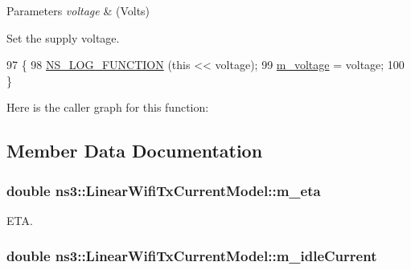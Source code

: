 \begin{DoxyParams}{Parameters}
{\em voltage} & (Volts)\\
\hline
\end{DoxyParams}
Set the supply voltage. 
\begin{DoxyCode}
97 \{
98   \hyperlink{log-macros-disabled_8h_a90b90d5bad1f39cb1b64923ea94c0761}{NS\_LOG\_FUNCTION} (\textcolor{keyword}{this} << voltage);
99   \hyperlink{classns3_1_1LinearWifiTxCurrentModel_ab6d30871bdd27d1e1539c3e40e447339}{m\_voltage} = voltage;
100 \}
\end{DoxyCode}


Here is the caller graph for this function\+:




\subsection{Member Data Documentation}
\subsubsection[{\texorpdfstring{m\+\_\+eta}{m_eta}}]{\setlength{\rightskip}{0pt plus 5cm}double ns3\+::\+Linear\+Wifi\+Tx\+Current\+Model\+::m\+\_\+eta\hspace{0.3cm}{\ttfamily [private]}}\hypertarget{classns3_1_1LinearWifiTxCurrentModel_a20a1e937625160bbeea19c57cfd85e2b}{}\label{classns3_1_1LinearWifiTxCurrentModel_a20a1e937625160bbeea19c57cfd85e2b}


E\+TA. 

\subsubsection[{\texorpdfstring{m\+\_\+idle\+Current}{m_idleCurrent}}]{\setlength{\rightskip}{0pt plus 5cm}double ns3\+::\+Linear\+Wifi\+Tx\+Current\+Model\+::m\+\_\+idle\+Current\hspace{0.3cm}{\ttfamily [private]}}\hypertarget{classns3_1_1LinearWifiTxCurrentModel_ac5dd2a8974fa09aa72e7e4b26dee9f94}{}\label{classns3_1_1LinearWifiTxCurrentModel_ac5dd2a8974fa09aa72e7e4b26dee9f94}


